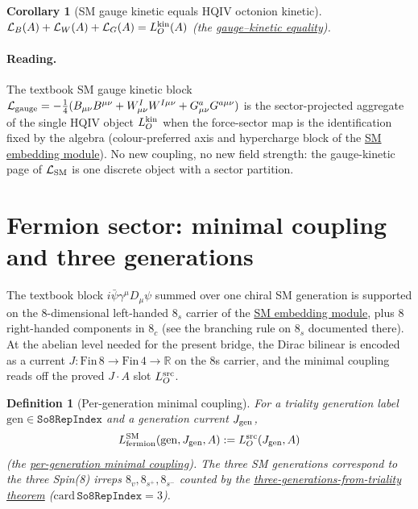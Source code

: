 \documentclass[11pt]{amsart}
\newtheorem{definition}[theorem]{Definition}
\newtheorem{corollary}[theorem]{Corollary}
\begin{document}
\begin{corollary}[SM gauge kinetic equals HQIV octonion kinetic]
\label{cor:gauge-aggregate}
$\mathcal{L}_B(A)+\mathcal{L}_W(A)+\mathcal{L}_G(A)=L_O^{\rm kin}(A)$
(the \hyperref[lean:gauge-eq-kin]{gauge--kinetic equality}).
\end{corollary}

\paragraph{Reading.}
The textbook SM gauge kinetic block
$\mathcal{L}_{\rm gauge}=-\tfrac14(B_{\mu\nu}B^{\mu\nu}+W^I_{\mu\nu}W^{I\mu\nu}
+G^a_{\mu\nu}G^{a\mu\nu})$ is the sector-projected aggregate of the single
HQIV object $L_O^{\rm kin}$ when the force-sector map is the identification
fixed by the algebra (colour-preferred axis and hypercharge block of the
\hyperref[lean:sm-embedding]{SM embedding module}). No new coupling, no new
field strength: the gauge-kinetic page of $\mathcal{L}_{\rm SM}$ is one
discrete object with a sector partition.

\section{Fermion sector: minimal coupling and three generations}
\label{sec:fermion}

The textbook block $i\bar\psi\gamma^\mu D_\mu\psi$ summed over one chiral
SM generation is supported on the 8-dimensional left-handed $8_s$ carrier of
the \hyperref[lean:sm-embedding]{SM embedding module}, plus 8 right-handed
components in $8_c$ (see the branching rule on $8_s$ documented there).
At the abelian level needed for the present bridge, the Dirac bilinear is
encoded as a current $J:\mathrm{Fin}\,8\to\mathrm{Fin}\,4\to\mathbb{R}$ on
the 8s carrier, and the minimal coupling reads off the proved $J\cdot A$ slot
$L_O^{\rm src}$.

\begin{definition}[Per-generation minimal coupling]
\label{def:fermion-coupling}
For a triality generation label $\mathrm{gen}\in\texttt{So8RepIndex}$ and a
generation current $J_{\rm gen}$,
\[
L_{\rm fermion}^{\rm SM}(\mathrm{gen}, J_{\rm gen}, A) := L_O^{\rm src}(J_{\rm gen},A)
\]
(the \hyperref[lean:fermion-minimal]{per-generation minimal coupling}).
The three SM generations correspond to the three Spin(8) irreps
$8_v, 8_{s^+}, 8_{s^-}$ counted by the
\hyperref[lean:three-gen-reps]{three-generations-from-triality theorem}
($\mathrm{card}\,\texttt{So8RepIndex}=3$).
\end{definition}
\end{document}
